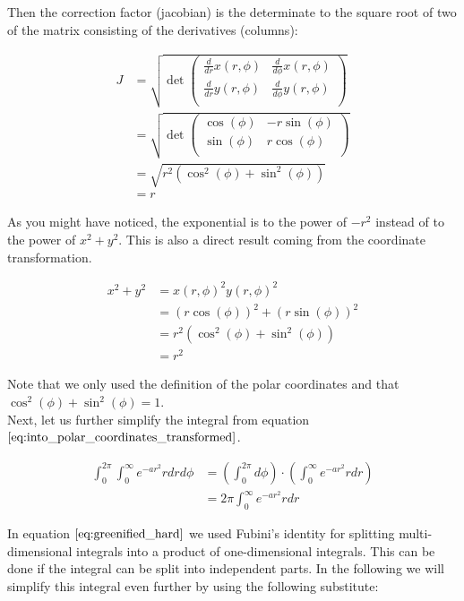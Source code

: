 \documentclass{paper}
\begin{document}
Then the correction factor (jacobian) is the determinate to the square root of two of the matrix consisting of the derivatives (columns):

\begin{align}
J
&=
\sqrt{\det
\begin{pmatrix}
\frac{d}{dr} x(r,\phi) & \frac{d}{d\phi} x(r,\phi) \\
\frac{d}{dr} y(r,\phi) & \frac{d}{d\phi} y(r,\phi) \\
\end{pmatrix}} \\
&= 
\sqrt{\det
\begin{pmatrix}
\cos(\phi) & -r \sin(\phi) \\
\sin(\phi) & r \cos(\phi) \\
\end{pmatrix}} \\
&= \sqrt{r^2(\cos^2(\phi) + \sin^2(\phi))} \\
&= r
\label{eq:jacobian}
\end{align}

As you might have noticed, the exponential is to the power of $-r^2$ instead of to the power of $x^2 + y^2$. This is also a direct result coming from the coordinate transformation.

\begin{align}
    x^2 + y^2 
    &= x(r, \phi)^2 y(r, \phi)^2 \\
    &= (r\cos(\phi))^2+(r \sin(\phi))^2 \\
    &= r^2 (\cos^2(\phi) + \sin^2(\phi)) \\
    &= r^2
\end{align}

Note that we only used the definition of the polar coordinates and that $\cos^2(\phi) + \sin^2(\phi) = 1$. \\

Next, let us further simplify the integral from equation $\ref{eq:into_polar_coordinates_transformed}$.

\begin{align}
    \int_{0}^{2 \pi} \int_{0}^{\infty} e^{-ar^2} r dr d\phi
    &= (\int_{0}^{2 \pi} d\phi)\cdot (\int_{0}^{\infty} e^{-ar^2} r dr) \\
    &= 2\pi \int_{0}^{\infty} e^{-ar^2} r dr
\label{eq:greenified_hard}
\end{align}

In equation $\ref{eq:greenified_hard}$ we used Fubini's identity for splitting multi-dimensional integrals into a product of one-dimensional integrals. This can be done if the integral can be split into independent parts. In the following we will simplify this integral even further by using the following substitute:
\end{document}

